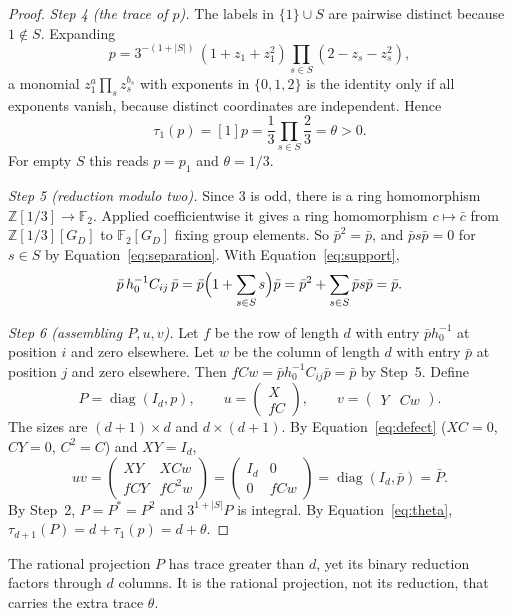 \documentclass[11pt]{article}
\theoremstyle{remark}
\numberwithin{equation}{section}
\newcommand{\F}{\mathbb F}
\newcommand{\Z}{\mathbb Z}
\newcommand{\diag}{\operatorname{diag}}
\begin{document}
\begin{proof}
\emph{Step 4 (the trace of $p$).} The labels in $\{1\}\cup S$ are pairwise distinct because $1\notin S$. Expanding
\[
 p=3^{-(1+|S|)}\,(1+z_1+z_1^2)\prod_{s\in S}(2-z_s-z_s^2),
\]
a monomial $z_1^{a}\prod_sz_s^{b_s}$ with exponents in $\{0,1,2\}$ is the identity only if all exponents vanish, because distinct coordinates are independent. Hence
\begin{equation}\label{eq:theta}
 \tau_1(p)=[1]p=\frac13\prod_{s\in S}\frac23=\theta>0.
\end{equation}
For empty $S$ this reads $p=p_1$ and $\theta=1/3$.

\emph{Step 5 (reduction modulo two).} Since $3$ is odd, there is a ring homomorphism $\Z[1/3]\to\F_2$. Applied coefficientwise it gives a ring homomorphism $c\mapsto\bar c$ from $\Z[1/3][G_D]$ to $\F_2[G_D]$ fixing group elements. So $\bar p^2=\bar p$, and $\bar ps\bar p=0$ for $s\in S$ by Equation~\eqref{eq:separation}. With Equation~\eqref{eq:support},
\[
 \bar p\,h_0^{-1}C_{ij}\,\bar p
 =\bar p\Bigl(1+\sum_{s\in S}s\Bigr)\bar p=\bar p^2+\sum_{s\in S}\bar ps\bar p=\bar p.
\]

\emph{Step 6 (assembling $P,u,v$).} Let $f$ be the row of length $d$ with entry $\bar ph_0^{-1}$ at position $i$ and zero elsewhere. Let $w$ be the column of length $d$ with entry $\bar p$ at position $j$ and zero elsewhere. Then $fCw=\bar ph_0^{-1}C_{ij}\bar p=\bar p$ by Step~5. Define
\[
 P=\diag(I_d,p),\qquad
 u=\begin{pmatrix}X\\fC\end{pmatrix},\qquad
 v=\begin{pmatrix}Y&Cw\end{pmatrix}.
\]
The sizes are $(d+1)\times d$ and $d\times(d+1)$. By Equation~\eqref{eq:defect} ($XC=0$, $CY=0$, $C^2=C$) and $XY=I_d$,
\[
 uv=\begin{pmatrix}XY&XCw\\fCY&fC^2w\end{pmatrix}
   =\begin{pmatrix}I_d&0\\0&fCw\end{pmatrix}
   =\diag(I_d,\bar p)=\bar P.
\]
By Step~2, $P=P^*=P^2$ and $3^{1+|S|}P$ is integral. By Equation~\eqref{eq:theta}, $\tau_{d+1}(P)=d+\tau_1(p)=d+\theta$.
\end{proof}

The rational projection $P$ has trace greater than $d$, yet its binary reduction factors through $d$ columns. It is the rational projection, not its reduction, that carries the extra trace $\theta$.
\end{document}
